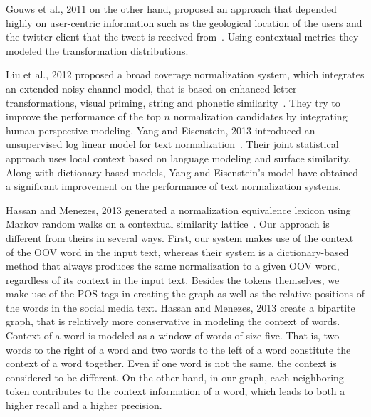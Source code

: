 \documentclass[a4paper,onesided,12pt]{report}
\begin{document}
Gouws et al., 2011 on the other hand, proposed an approach that depended highly on user-centric information such as the geological location of the users and the twitter client that the tweet is received from~\cite{Gouws:2011:CBL:2021109.2021113}. Using contextual metrics they modeled the transformation distributions.

Liu et al., 2012 proposed a broad coverage normalization system, which integrates an extended noisy channel model, that is based on enhanced letter transformations, visual priming, string and phonetic similarity~\cite{liu2012broad}. They try to improve the performance of the top $n$ normalization candidates by integrating human perspective modeling.
Yang and Eisenstein, 2013 introduced an unsupervised log linear model for text normalization~\cite{DBLP:conf/emnlp/YangE13}. Their joint statistical approach uses local context based on language modeling and surface similarity. Along with dictionary based models, Yang and Eisenstein's model have obtained a significant improvement on the performance of text normalization systems.

Hassan and Menezes, 2013 generated a normalization equivalence lexicon using Markov random walks on a contextual similarity lattice~\cite{DBLP:conf/acl/HassanM13}. Our approach is different from theirs in several ways. First, our system makes use of the context of the OOV word in the input text, whereas their system is a dictionary-based method that always produces the same normalization to a given OOV word, regardless of its context in the input text. Besides the tokens themselves, we make use of the POS tags in creating the graph as well as the relative positions of the words in the social media text. Hassan and Menezes, 2013 create a bipartite graph, that is relatively more conservative in modeling the context of words. Context of a word is modeled as a window of words of size five. That is, two words to the right of a word and two words to the left of a word constitute the context of a word together. Even if one word is not the same, the context is considered to be different. On the other hand, in our graph, each neighboring token contributes to the context information of a word, which leads to both a higher recall and a higher precision.
\end{document}
